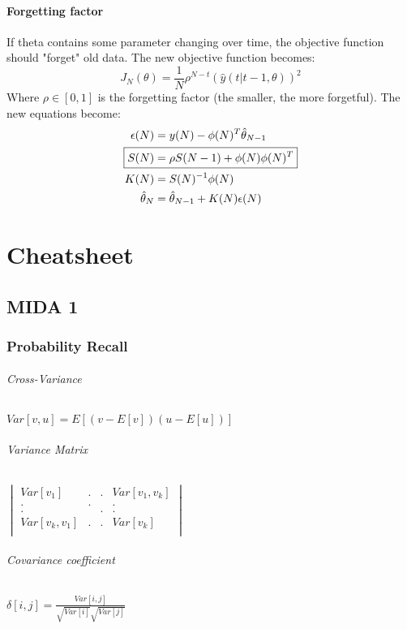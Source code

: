 \documentclass{report}
\let\OldPart\part
\renewcommand{\part}{\newpage\OldPart}
\begin{document}
\subsection{Forgetting factor}
If theta contains some parameter changing over time, the objective function should "forget" old data. The new objective function becomes:
\[
J_N(\theta)=\frac{1}{N}
\rho^{N-t}\left(\hat{y}(t|t-1,\theta)\right)^2
\]
Where $\rho\in\left[0,1\right]$ is the forgetting factor (the smaller, the more forgetful). The new equations become:
\begin{align*}
\epsilon(N)&=y(N)-\phi(N)^T\hat{\theta}_{N-1}\\
\Aboxed{
S(N)&=\rho S(N-1)+\phi(N)\phi(N)^T
}\\
K(N)&=S(N)^{-1}\phi(N)\\
\hat{\theta}_N&=\hat{\theta}_{N-1}+K(N)\epsilon(N)
\end{align*}

\newpage
\appendix
\part{Cheatsheet}
\chapter{MIDA 1}
\section{Probability Recall}
\paragraph{Cross-Variance}
$Var[v,u]=E[(v-E[v])(u-E[u])]$
\paragraph{Variance Matrix}
$\begin{vmatrix}
	Var[v_1]			&	.	&	.	&	Var[v_1,v_k]		\\
		.			&	.	&		&		.			\\
		.			&		&	.	&		.			\\
	Var[v_k,v_1]		&	.	&	.	&	Var[v_k]			\\
				
\end{vmatrix}$
\paragraph{Covariance coefficient}
	$\delta[i,j]=\frac{Var[i,j]}{\sqrt{Var[i]}\sqrt{Var[j]}}$
\end{document}
